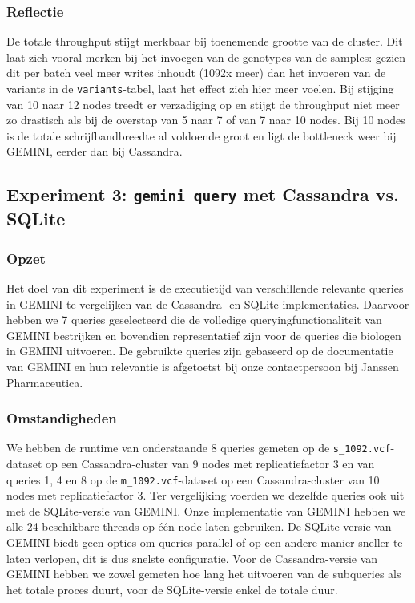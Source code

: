 \subsubsection{Reflectie}

De totale throughput stijgt merkbaar bij toenemende grootte van de cluster. Dit laat zich vooral merken bij het invoegen van de genotypes van de samples: gezien dit per batch veel meer writes inhoudt  (1092x meer) dan het invoeren van de variants in de  \texttt{variants}-tabel, laat het effect zich hier meer voelen. Bij stijging van 10 naar 12 nodes treedt er verzadiging op en stijgt de throughput niet meer zo drastisch als bij de overstap van 5 naar 7 of van 7 naar 10 nodes. Bij 10 nodes is de totale schrijfbandbreedte al voldoende groot en ligt de bottleneck weer bij GEMINI, eerder dan bij Cassandra.

\subsection{Experiment 3: \texttt{gemini query} met Cassandra vs. SQLite}
\label{exp3}

\subsubsection{Opzet}
Het doel van dit experiment is de executietijd van verschillende relevante queries in GEMINI te vergelijken van de Cassandra- en SQLite-implementaties. Daarvoor hebben we 7 queries geselecteerd die de volledige queryingfunctionaliteit van GEMINI bestrijken en bovendien representatief zijn voor de queries die biologen in GEMINI uitvoeren. De gebruikte queries zijn gebaseerd op de documentatie van GEMINI en hun relevantie is afgetoetst bij onze contactpersoon bij Janssen Pharmaceutica.

\subsubsection{Omstandigheden}

We hebben de runtime van onderstaande 8 queries gemeten op de \texttt{s\_1092.vcf}-dataset op een Cassandra-cluster van 9 nodes met replicatiefactor 3 en van queries 1, 4 en 8 op de \texttt{m\_1092.vcf}-dataset op een Cassandra-cluster van 10 nodes met replicatiefactor 3. Ter vergelijking voerden we dezelfde queries ook uit met de SQLite-versie van GEMINI. Onze implementatie van GEMINI hebben we alle 24 beschikbare threads op \'e\'en node laten gebruiken. De SQLite-versie van GEMINI biedt geen opties om queries parallel of op een andere manier sneller te laten verlopen, dit is dus snelste configuratie. Voor de Cassandra-versie van GEMINI hebben we zowel gemeten hoe lang het uitvoeren van de subqueries als het totale proces duurt, voor de SQLite-versie enkel de totale duur.

